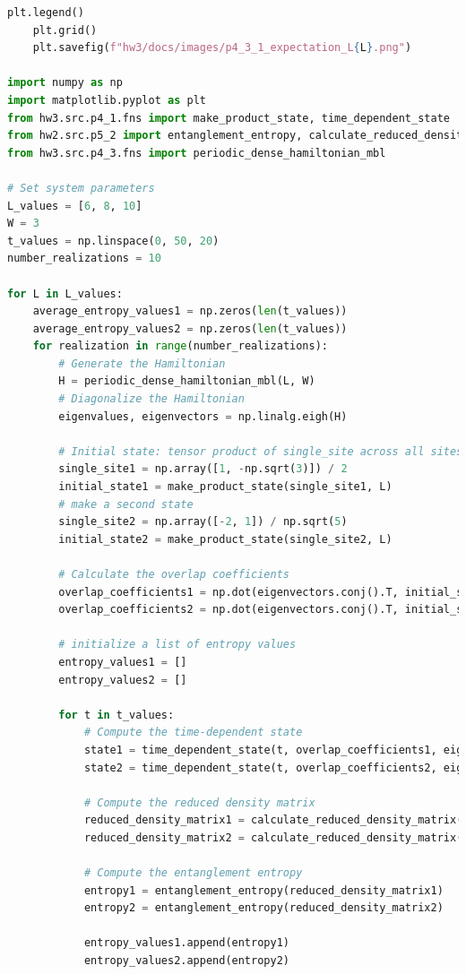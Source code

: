 \documentclass[12pt]{article}
\begin{document}
\begin{lstlisting}[language=Python]
    plt.legend()
    plt.grid()
    plt.savefig(f"hw3/docs/images/p4_3_1_expectation_L{L}.png")

import numpy as np
import matplotlib.pyplot as plt
from hw3.src.p4_1.fns import make_product_state, time_dependent_state
from hw2.src.p5_2 import entanglement_entropy, calculate_reduced_density_matrix
from hw3.src.p4_3.fns import periodic_dense_hamiltonian_mbl

# Set system parameters
L_values = [6, 8, 10]
W = 3
t_values = np.linspace(0, 50, 20)
number_realizations = 10

for L in L_values:
    average_entropy_values1 = np.zeros(len(t_values))
    average_entropy_values2 = np.zeros(len(t_values))
    for realization in range(number_realizations):
        # Generate the Hamiltonian
        H = periodic_dense_hamiltonian_mbl(L, W)
        # Diagonalize the Hamiltonian
        eigenvalues, eigenvectors = np.linalg.eigh(H)

        # Initial state: tensor product of single_site across all sites
        single_site1 = np.array([1, -np.sqrt(3)]) / 2
        initial_state1 = make_product_state(single_site1, L)
        # make a second state
        single_site2 = np.array([-2, 1]) / np.sqrt(5)
        initial_state2 = make_product_state(single_site2, L)

        # Calculate the overlap coefficients
        overlap_coefficients1 = np.dot(eigenvectors.conj().T, initial_state1)
        overlap_coefficients2 = np.dot(eigenvectors.conj().T, initial_state2)

        # initialize a list of entropy values
        entropy_values1 = []
        entropy_values2 = []

        for t in t_values:
            # Compute the time-dependent state
            state1 = time_dependent_state(t, overlap_coefficients1, eigenvalues, eigenvectors)
            state2 = time_dependent_state(t, overlap_coefficients2, eigenvalues, eigenvectors)

            # Compute the reduced density matrix
            reduced_density_matrix1 = calculate_reduced_density_matrix(state1, L, L // 2)
            reduced_density_matrix2 = calculate_reduced_density_matrix(state2, L, L // 2)

            # Compute the entanglement entropy
            entropy1 = entanglement_entropy(reduced_density_matrix1)
            entropy2 = entanglement_entropy(reduced_density_matrix2)
            
            entropy_values1.append(entropy1)
            entropy_values2.append(entropy2)


\end{lstlisting}
\end{document}
